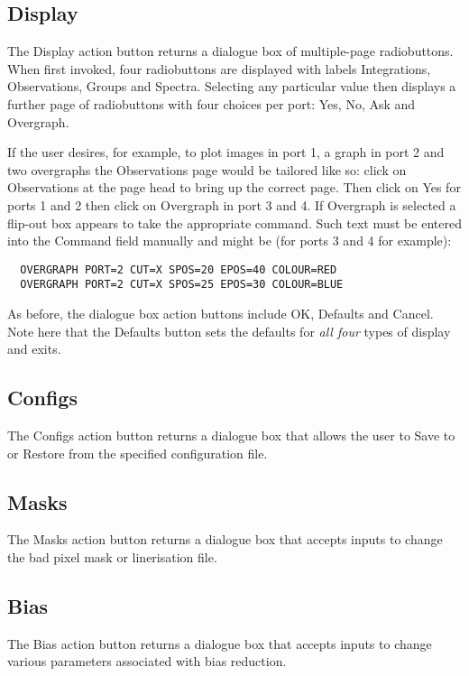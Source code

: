 \documentclass[a4paper]{book}
\renewcommand{\_}{{\tt\char'137}}
\begin{document}
\subsection{Display}
The {\sf Display} action button returns a dialogue box of
multiple-page radiobuttons. When first invoked, four radiobuttons are displayed with labels
{\sf Integrations}, {\sf Observations}, {\sf Groups} and {\sf Spectra}. Selecting any particular
value then displays a further page of radiobuttons with four choices per port: {\sf Yes},
{\sf No}, {\sf Ask} and {\sf Overgraph}.

If the user desires, for example, to plot images in port 1, a graph in port 2 and two overgraphs the
{\sf Observations} page would be tailored like so: click on {\sf Observations} at the page head to
bring up the correct page. Then click on {\sf Yes} for ports 1 and 2 then
click on {\sf Overgraph} in port 3 and 4. If {\sf Overgraph} is selected a flip-out box appears
to take the appropriate command. Such text must be entered into the {\sf Command} field
manually and might be (for ports 3 and 4 for example):

\begin{verbatim}
  OVERGRAPH PORT=2 CUT=X SPOS=20 EPOS=40 COLOUR=RED
  OVERGRAPH PORT=2 CUT=X SPOS=25 EPOS=30 COLOUR=BLUE
\end{verbatim}

As before, the dialogue box action buttons include {\sf OK}, {\sf Defaults} and {\sf Cancel}.
Note here that the {\sf Defaults} button sets the defaults for {\em all four} types of display
and exits.

\subsection{Configs}
The {\sf Configs} action button returns a dialogue box that
allows the user to {\sf Save} to or {\sf Restore} from the specified configuration
file.

\subsection{Masks}
The {\sf Masks} action button returns a dialogue box that
accepts inputs to change the bad pixel mask or linerisation file.

\subsection{Bias}
The {\sf Bias} action button returns a dialogue box that
accepts inputs to change various parameters associated with {\sc bias} reduction.
\end{document}
